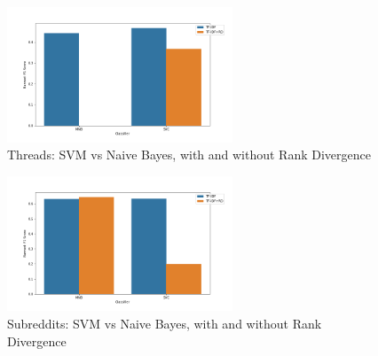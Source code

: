 \documentclass[11pt]{article}[twocolumn]
\begin{document}
\begin{figure}[H]
    \caption{Threads: SVM vs Naive Bayes, with and without Rank Divergence}
    \centering
    \includegraphics[width=0.6\textwidth]{threads_clf_barplot.png}
\end{figure}

\begin{figure}[H]
    \caption{Subreddits: SVM vs Naive Bayes, with and without Rank Divergence}
    \centering
    \includegraphics[width=0.6\textwidth]{subreddits_clf_barplot.png}
\end{figure}
\end{document}
